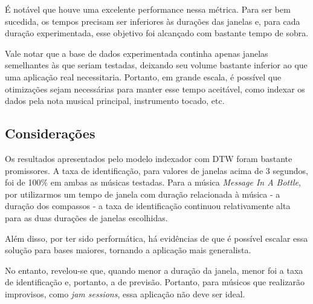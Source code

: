 É notável que houve uma excelente performance nessa métrica. Para ser bem sucedida, os tempos precisam ser inferiores às durações das janelas e, para cada duração experimentada, esse objetivo foi alcançado com bastante tempo de sobra.

Vale notar que a base de dados experimentada continha apenas janelas semelhantes às que seriam testadas, deixando seu volume bastante inferior ao que uma aplicação real necessitaria. Portanto, em grande escala, é possível que otimizações sejam necessárias para manter esse tempo aceitável, como indexar os dados pela nota musical principal, instrumento tocado, etc.

\subsection{Considerações}

Os resultados apresentados pelo modelo indexador com DTW foram bastante promissores. A taxa de identificação, para valores de janelas acima de 3 segundos, foi de 100\% em ambas as músicas testadas. Para a música \textit{Message In A Bottle}, por utilizarmos um tempo de janela com duração relacionada à música - a duração dos compassos - a taxa de identificação continuou relativamente alta para as duas durações de janelas escolhidas.

Além disso, por ter sido performática, há evidências de que é possível escalar essa solução para bases maiores, tornando a aplicação mais generalista.

No entanto, revelou-se que, quando menor a duração da janela, menor foi a taxa de identificação e, portanto, a de previsão. Portanto, para músicos que realizarão improvisos, como \textit{jam sessions}, essa aplicação não deve ser ideal.